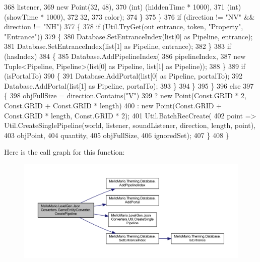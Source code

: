 \begin{DoxyCode}
368                             listener,
369                             \textcolor{keyword}{new} Point(32, 48),
370                             (\textcolor{keywordtype}{int}) (hiddenTime * 1000),
371                             (\textcolor{keywordtype}{int}) (showTime * 1000),
372                             32,
373                             color);
374                     \}
375                 \}
376                 \textcolor{keywordflow}{if} (direction != \textcolor{stringliteral}{"NV"} && direction != \textcolor{stringliteral}{"NH"})
377                 \{
378                     \textcolor{keywordflow}{if} (Util.TryGet(out entrance, token, \textcolor{stringliteral}{"Property"}, \textcolor{stringliteral}{"Entrance"}))
379                     \{
380                         Database.SetEntranceIndex(list[0] as Pipeline, entrance);
381                         Database.SetEntranceIndex(list[1] as Pipeline, entrance);
382                     \}
383                     \textcolor{keywordflow}{if} (hasIndex)
384                     \{
385                         Database.AddPipelineIndex(
386                             pipelineIndex,
387                             \textcolor{keyword}{new} Tuple<Pipeline, Pipeline>(list[0] as Pipeline, 
      list[1] as Pipeline));
388                     \}
389                     \textcolor{keywordflow}{if} (isPortalTo)
390                     \{
391                         Database.AddPortal(list[0] as Pipeline, portalTo);
392                         Database.AddPortal(list[1] as Pipeline, portalTo);
393                     \}
394                 \}
395             \}
396             \textcolor{keywordflow}{else}
397             \{
398                 objFullSize = direction.Contains(\textcolor{stringliteral}{"V"})
399                     ? \textcolor{keyword}{new} Point(Const.GRID * 2, Const.GRID + Const.GRID * length)
400                     : new Point(Const.GRID + Const.GRID * length, Const.GRID * 2);
401                 Util.BatchRecCreate(
402                     point => Util.CreateSinglePipeline(world, listener, 
      soundListener, direction, length, point),
403                     objPoint,
404                     quantity,
405                     objFullSize,
406                     ignoredSet);
407             \}
408         \}
\end{DoxyCode}
Here is the call graph for this function\+:
\nopagebreak
\begin{figure}[H]
\begin{center}
\leavevmode
\includegraphics[width=350pt]{classMelloMario_1_1LevelGen_1_1JsonConverters_1_1GameEntityConverter_a078693ba39b06cb636e8d8cb0193a4a5_cgraph}
\end{center}
\end{figure}

